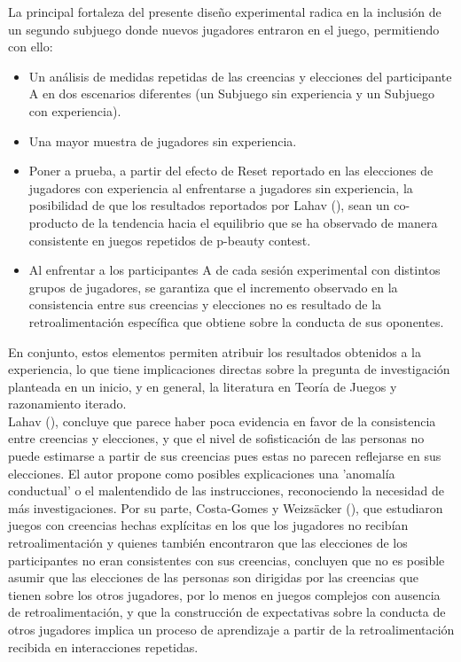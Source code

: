 La principal fortaleza del presente diseño experimental radica en la inclusión de un segundo subjuego donde nuevos jugadores entraron en el juego, permitiendo con ello:\\

\begin{itemize}
\item Un análisis de medidas repetidas de las creencias y elecciones del participante A en dos escenarios diferentes (un Subjuego sin experiencia y un Subjuego con experiencia).\\

\item Una mayor muestra de jugadores sin experiencia.\\

\item Poner a prueba, a partir del efecto de Reset reportado en las elecciones de jugadores con experiencia al enfrentarse a jugadores sin experiencia, la posibilidad de que los resultados reportados por Lahav (\citeyear{Lahav}), sean un co-producto de la tendencia hacia el equilibrio que se ha observado de manera consistente en juegos repetidos de p-beauty contest.\\

\item Al enfrentar a los participantes A de cada sesión experimental con distintos grupos de jugadores, se garantiza que el incremento observado en la consistencia entre sus creencias y elecciones no es resultado de la retroalimentación específica que obtiene sobre la conducta de sus oponentes.\\
\end{itemize}

En conjunto, estos elementos permiten atribuir los resultados obtenidos a la experiencia, lo que tiene implicaciones directas sobre la pregunta de investigación planteada en un inicio, y en general, la literatura en Teoría de Juegos y razonamiento iterado.\\

Lahav (\citeyear{Lahav}), concluye que parece haber poca evidencia en favor de la consistencia entre creencias y elecciones, y que el nivel de sofisticación de las personas no puede estimarse a partir de sus creencias pues estas no parecen reflejarse en sus elecciones. El autor propone como posibles explicaciones una 'anomalía conductual' o el malentendido de las instrucciones, reconociendo la necesidad de más investigaciones. Por su parte, Costa-Gomes y Weizsäcker (\citeyear{Costa-Gomes}), que estudiaron juegos con creencias hechas explícitas en los que los jugadores no recibían retroalimentación y quienes también encontraron que las elecciones de los participantes no eran consistentes con sus creencias, concluyen que no es posible asumir que las elecciones de las personas son dirigidas por las creencias que tienen sobre los otros jugadores, por lo menos en juegos complejos con ausencia de retroalimentación, y que la construcción de expectativas sobre la conducta de otros jugadores implica un proceso de aprendizaje a partir de la retroalimentación recibida en interacciones repetidas.\\

